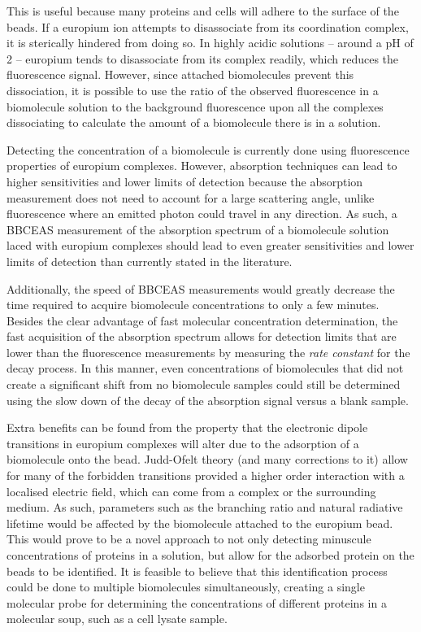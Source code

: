 This is useful because many proteins and cells will adhere to the surface of
the beads. If a europium ion attempts to disassociate from its coordination
complex, it is sterically hindered from doing so. In highly acidic solutions
-- around a pH of 2 -- europium tends to disassociate from its complex
readily, which reduces the fluorescence signal. However, since attached
biomolecules prevent this dissociation, it is possible to use the ratio of the
observed fluorescence in a biomolecule solution to the background fluorescence
upon all the complexes dissociating to calculate the amount of a biomolecule
there is in a solution.

Detecting the concentration of a biomolecule is currently done using
fluorescence properties of europium complexes. However, absorption techniques
can lead to higher sensitivities and lower limits of detection because the
absorption measurement does not need to account for a large scattering
angle, unlike fluorescence where an emitted photon could travel in any
direction. As such, a \ac{BBCEAS} measurement of the
absorption spectrum of a biomolecule solution laced with europium complexes
should lead to even greater sensitivities and lower limits of detection than
currently stated in the literature.

Additionally, the speed of \ac{BBCEAS} measurements would greatly decrease the
time required to acquire biomolecule concentrations to only a few minutes.
Besides the clear advantage of fast molecular concentration determination,
the fast acquisition of the absorption spectrum allows for detection limits
that are lower than the fluorescence measurements by measuring the \emph{rate
constant} for the decay process. In this manner, even concentrations of
biomolecules that did not create a significant shift from no biomolecule
samples could still be determined using the slow down of the decay of the
absorption signal versus a blank sample.

Extra benefits can be found from the property that the electronic dipole
transitions in europium complexes will alter due to the adsorption of a
biomolecule onto the bead. Judd-Ofelt theory (and many corrections to
it) allow for many of the forbidden transitions provided a higher order
interaction with a localised electric field, which can come from a complex
or the surrounding medium. As such, parameters such as the branching ratio
and natural radiative lifetime would be affected by the biomolecule attached
to the europium bead. This would prove to be a novel approach to not only
detecting minuscule concentrations of proteins in a solution, but allow for
the adsorbed protein on the beads to be identified. It is feasible to believe
that this identification process could be done to multiple biomolecules
simultaneously, creating a single molecular probe for determining the
concentrations of different proteins in a molecular soup, such as a cell
lysate sample.

